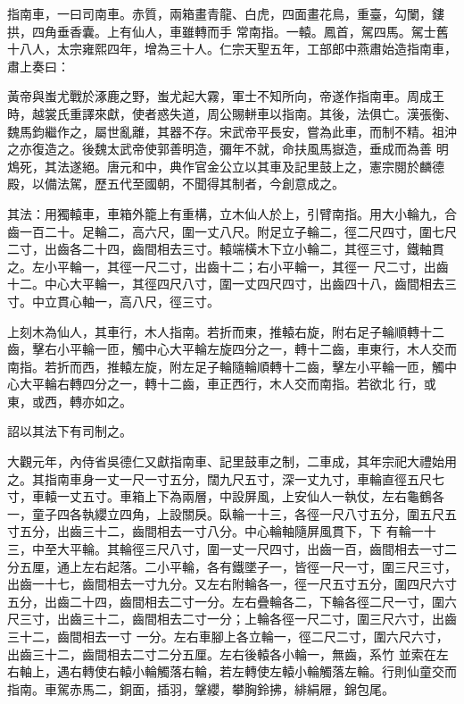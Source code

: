 \begin{pinyinscope}
 指南車，一曰司南車。赤質，兩箱畫青龍、白虎，四面畫花鳥，重臺，勾闌，鏤拱，四角垂香囊。上有仙人，車雖轉而手
 常南指。一轅。鳳首，駕四馬。駕士舊十八人，太宗雍熙四年，增為三十人。仁宗天聖五年，工部郎中燕肅始造指南車，肅上奏曰：



 黃帝與蚩尤戰於涿鹿之野，蚩尤起大霧，軍士不知所向，帝遂作指南車。周成王時，越裳氏重譯來獻，使者惑失道，周公賜軿車以指南。其後，法俱亡。漢張衡、魏馬鈞繼作之，屬世亂離，其器不存。宋武帝平長安，嘗為此車，而制不精。祖沖之亦復造之。後魏太武帝使郭善明造，彌年不就，命扶風馬嶽造，垂成而為善
 明鴆死，其法遂絕。唐元和中，典作官金公立以其車及記里鼓上之，憲宗閱於麟德殿，以備法駕，歷五代至國朝，不聞得其制者，今創意成之。



 其法：用獨轅車，車箱外籠上有重構，立木仙人於上，引臂南指。用大小輪九，合齒一百二十。足輪二，高六尺，圍一丈八尺。附足立子輪二，徑二尺四寸，圍七尺二寸，出齒各二十四，齒間相去三寸。轅端橫木下立小輪二，其徑三寸，鐵軸貫之。左小平輪一，其徑一尺二寸，出齒十二；右小平輪一，其徑一
 尺二寸，出齒十二。中心大平輪一，其徑四尺八寸，圍一丈四尺四寸，出齒四十八，齒間相去三寸。中立貫心軸一，高八尺，徑三寸。



 上刻木為仙人，其車行，木人指南。若折而東，推轅右旋，附右足子輪順轉十二齒，擊右小平輪一匝，觸中心大平輪左旋四分之一，轉十二齒，車東行，木人交而南指。若折而西，推轅左旋，附左足子輪隨輪順轉十二齒，擊左小平輪一匝，觸中心大平輪右轉四分之一，轉十二齒，車正西行，木人交而南指。若欲北
 行，或東，或西，轉亦如之。



 詔以其法下有司制之。


大觀元年，內侍省吳德仁又獻指南車、記里鼓車之制，二車成，其年宗祀大禮始用之。其指南車身一丈一尺一寸五分，闊九尺五寸，深一丈九寸，車輪直徑五尺七寸，車轅一丈五寸。車箱上下為兩層，中設屏風，上安仙人一執仗，左右龜鶴各一，童子四各執纓立四角，上設關戾。臥輪一十三，各徑一尺八寸五分，圍五尺五寸五分，出齒三十二，齒間相去一寸八分。中心輪軸隨屏風貫下，下
 有輪一十三，中至大平輪。其輪徑三尺八寸，圍一丈一尺四寸，出齒一百，齒間相去一寸二分五厘，通上左右起落。二小平輪，各有鐵墜子一，皆徑一尺一寸，圍三尺三寸，出齒一十七，齒間相去一寸九分。又左右附輪各一，徑一尺五寸五分，圍四尺六寸五分，出齒二十四，齒間相去二寸一分。左右疊輪各二，下輪各徑二尺一寸，圍六尺三寸，出齒三十二，齒間相去二寸一分；上輪各徑一尺二寸，圍三尺六寸，出齒三十二，齒間相去一寸
 一分。左右車腳上各立輪一，徑二尺二寸，圍六尺六寸，出齒三十二，齒間相去二寸二分五厘。左右後轅各小輪一，無齒，系竹
 並索在左右軸上，遇右轉使右轅小輪觸落右輪，若左轉使左轅小輪觸落左輪。行則仙童交而指南。車駕赤馬二，銅面，插羽，鞶纓，攀胸鈴拂，緋絹屜，錦包尾。




\end{pinyinscope}

